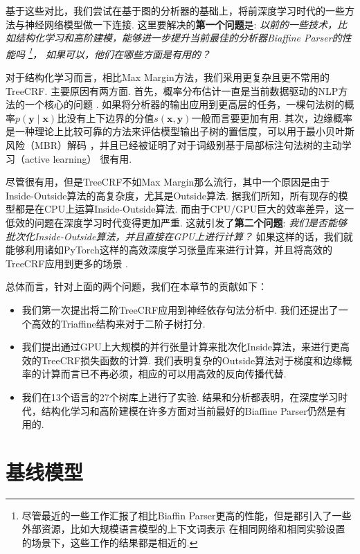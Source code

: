 基于这些对比，我们尝试在基于图的分析器的基础上，将前深度学习时代的一些方法与神经网络模型做一下连接.
这里要解决的\textbf{第一个问题}是:
\emph{
  以前的一些技术，比如结构化学习和高阶建模，能够进一步提升当前最佳的分析器Biaffine Parser的性能吗
  \footnote{
    尽管最近的一些工作汇报了相比Biaffin Parser更高的性能，但是都引入了一些外部资源，比如大规模语言模型的上下文词表示
    在相同网络和相同实验设置的场景下，这些工作的结果都是相近的.
  }，
  如果可以，他们在哪些方面是有用的？
}

对于结构化学习而言，相比Max Margin方法，我们采用更复杂且更不常用的TreeCRF.
主要原因有两方面.
首先，概率分布估计一直是当前数据驱动的NLP方法的一个核心的问题 \citep{le-zuidema-2014-inside}.
如果将分析器的输出应用到更高层的任务，一棵句法树的概率$p(\boldsymbol{y}\mid\boldsymbol{x})$比没有上下边界的分值$s (\boldsymbol{x},\boldsymbol{y})$一般而言要更加有用.
其次，边缘概率是一种理论上比较可靠的方法来评估模型输出子树的置信度，可以用于最小贝叶斯风险（MBR）解码 \citep{smith-smith-2007-probabilistic}，并且已经被证明了对于词级别基于局部标注句法树的主动学习（active learning） \citep{li-etal-2016-active}很有用.

尽管很有用，但是TreeCRF不如Max Margin那么流行，其中一个原因是由于Inside-Outside算法的高复杂度，尤其是Outside算法.
据我们所知，所有现存的模型都是在CPU上运算Inside-Outside算法.
而由于CPU/GPU巨大的效率差异，这一低效的问题在深度学习时代变得更加严重.
这就引发了\textbf{第二个问题}:
\emph{我们是否能够批次化Inside-Outside算法，并且直接在GPU上进行计算？}
如果这样的话，我们就能够利用诸如PyTorch这样的高效深度学习张量库来进行计算，并且将高效的TreeCRF应用到更多的场景 \citep{cai-etal-2017-crf,le-zuidema-2014-inside}.

总体而言，针对上面的两个问题，我们在本章节的贡献如下：
\begin{itemize}
  \item 我们第一次提出将二阶TreeCRF应用到神经依存句法分析中.
        我们还提出了一个高效的Triaffine结构来对于二阶子树打分.
  \item 我们提出通过GPU上大规模的并行张量计算来批次化Inside算法，来进行更高效的TreeCRF损失函数的计算.
        我们表明复杂的Outside算法对于梯度和边缘概率的计算而言已不再必须，相应的可以用高效的反向传播代替.
  \item 我们在13个语言的27个树库上进行了实验.
        结果和分析都表明，在深度学习时代，结构化学习和高阶建模在许多方面对当前最好的Biaffine Parser仍然是有用的.
\end{itemize}

\section{基线模型}
\label{sec:dep-basic-model}

